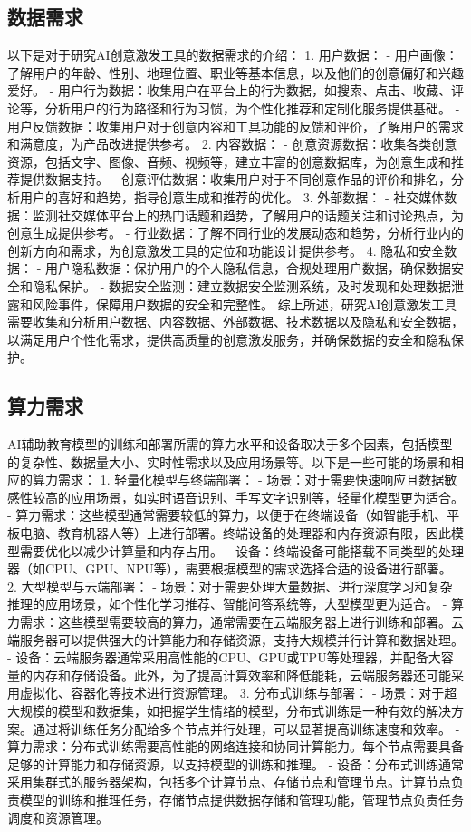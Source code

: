 \subsection{数据需求}
以下是对于研究AI创意激发工具的数据需求的介绍：
1. 用户数据：
- 用户画像：了解用户的年龄、性别、地理位置、职业等基本信息，以及他们的创意偏好和兴趣爱好。
- 用户行为数据：收集用户在平台上的行为数据，如搜索、点击、收藏、评论等，分析用户的行为路径和行为习惯，为个性化推荐和定制化服务提供基础。
- 用户反馈数据：收集用户对于创意内容和工具功能的反馈和评价，了解用户的需求和满意度，为产品改进提供参考。
2. 内容数据：
- 创意资源数据：收集各类创意资源，包括文字、图像、音频、视频等，建立丰富的创意数据库，为创意生成和推荐提供数据支持。
- 创意评估数据：收集用户对于不同创意作品的评价和排名，分析用户的喜好和趋势，指导创意生成和推荐的优化。
3. 外部数据：
- 社交媒体数据：监测社交媒体平台上的热门话题和趋势，了解用户的话题关注和讨论热点，为创意生成提供参考。
- 行业数据：了解不同行业的发展动态和趋势，分析行业内的创新方向和需求，为创意激发工具的定位和功能设计提供参考。
4. 隐私和安全数据：
- 用户隐私数据：保护用户的个人隐私信息，合规处理用户数据，确保数据安全和隐私保护。
- 数据安全监测：建立数据安全监测系统，及时发现和处理数据泄露和风险事件，保障用户数据的安全和完整性。
综上所述，研究AI创意激发工具需要收集和分析用户数据、内容数据、外部数据、技术数据以及隐私和安全数据，以满足用户个性化需求，提供高质量的创意激发服务，并确保数据的安全和隐私保护。
\subsection{算力需求}
AI辅助教育模型的训练和部署所需的算力水平和设备取决于多个因素，包括模型的复杂性、数据量大小、实时性需求以及应用场景等。以下是一些可能的场景和相应的算力需求：
1. 轻量化模型与终端部署：
  - 场景：对于需要快速响应且数据敏感性较高的应用场景，如实时语音识别、手写文字识别等，轻量化模型更为适合。
  - 算力需求：这些模型通常需要较低的算力，以便于在终端设备（如智能手机、平板电脑、教育机器人等）上进行部署。终端设备的处理器和内存资源有限，因此模型需要优化以减少计算量和内存占用。
  - 设备：终端设备可能搭载不同类型的处理器（如CPU、GPU、NPU等），需要根据模型的需求选择合适的设备进行部署。
2. 大型模型与云端部署：
  - 场景：对于需要处理大量数据、进行深度学习和复杂推理的应用场景，如个性化学习推荐、智能问答系统等，大型模型更为适合。
  - 算力需求：这些模型需要较高的算力，通常需要在云端服务器上进行训练和部署。云端服务器可以提供强大的计算能力和存储资源，支持大规模并行计算和数据处理。
  - 设备：云端服务器通常采用高性能的CPU、GPU或TPU等处理器，并配备大容量的内存和存储设备。此外，为了提高计算效率和降低能耗，云端服务器还可能采用虚拟化、容器化等技术进行资源管理。
3. 分布式训练与部署：
  - 场景：对于超大规模的模型和数据集，如把握学生情绪的模型，分布式训练是一种有效的解决方案。通过将训练任务分配给多个节点并行处理，可以显著提高训练速度和效率。
  - 算力需求：分布式训练需要高性能的网络连接和协同计算能力。每个节点需要具备足够的计算能力和存储资源，以支持模型的训练和推理。
  - 设备：分布式训练通常采用集群式的服务器架构，包括多个计算节点、存储节点和管理节点。计算节点负责模型的训练和推理任务，存储节点提供数据存储和管理功能，管理节点负责任务调度和资源管理。
